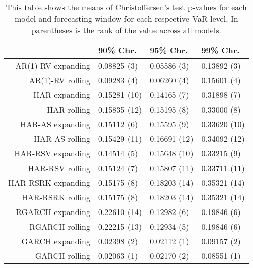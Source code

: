 \begin{table}[ht]
\centering
\begin{tabular}{rlll}
  \hline
 & 90\% Chr. & 95\% Chr. & 99\% Chr. \\ 
  \hline
AR(1)-RV expanding & 0.08825 (3) & 0.05586 (3) & 0.13892 (3) \\ 
  AR(1)-RV rolling & 0.09283 (4) & 0.06260 (4) & 0.15601 (4) \\ 
  HAR expanding & 0.15281 (10) & 0.14165 (7) & 0.31898 (7) \\ 
  HAR rolling & 0.15835 (12) & 0.15195 (8) & 0.33000 (8) \\ 
  HAR-AS expanding & 0.15112 (6) & 0.15595 (9) & 0.33620 (10) \\ 
  HAR-AS rolling & 0.15429 (11) & 0.16691 (12) & 0.34092 (12) \\ 
  HAR-RSV expanding & 0.14514 (5) & 0.15648 (10) & 0.33215 (9) \\ 
  HAR-RSV rolling & 0.15124 (7) & 0.15807 (11) & 0.33711 (11) \\ 
  HAR-RSRK expanding & 0.15175 (8) & 0.18203 (14) & 0.35321 (14) \\ 
  HAR-RSRK rolling & 0.15175 (8) & 0.18203 (14) & 0.35321 (14) \\ 
  RGARCH expanding & 0.22610 (14) & 0.12982 (6) & 0.19846 (6) \\ 
  RGARCH rolling & 0.22215 (13) & 0.12934 (5) & 0.19846 (6) \\ 
  GARCH expanding & 0.02398 (2) & 0.02112 (1) & 0.09157 (2) \\ 
  GARCH rolling & 0.02063 (1) & 0.02170 (2) & 0.08551 (1) \\ 
   \hline
\end{tabular}
\caption[Christoffersen's test means]{This table shows the means of Christoffersen's test p-values for each model and forecasting window for each respective VaR level. In parentheses is the rank of the value across all models. } 
\label{Table:VaR_means_Christoffersen}
\end{table}
